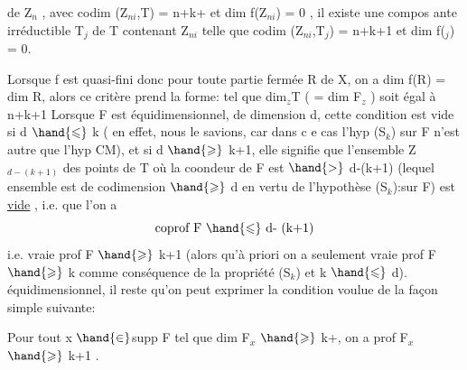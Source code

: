 
de Z$_n$ , avec codim (Z$_{ni}$,T) = n+k+ et dim f(Z$_{ni}$) = 0 , il existe
une compos ante irréductible T$_j$ de T contenant Z$_{ni}$ telle que
codim (Z$_{ni}$,T$_j$) = n+k+1 et dim f($_j$) = 0.

Lorsque f est quasi-fini donc pour toute partie fermée R de X,
on a dim f(R) = dim R, alors ce critère prend la forme:  
  tel que dim$_z$T ( = dim F$_z$ ) soit égal à
n+k+1  Lorsque F est équidimensionnel, 
de dimension d,  cette condition
est vide si d $\hand{\leqslant}$ k ( en effet, nous le savions, car dans c e cas l'hyp
(S$_k$) sur F n'est autre que l'hyp CM), et si d $\hand{\geqslant}$ k+1, elle signifie
que l'ensemble Z$_{d - (k+1)}$ des points de T où la coondeur de F est
$\hand{>}$ d-(k+1) (lequel ensemble est de codimension $\hand{\geqslant}$ d  en vertu de
l'hypothèse (S$_k$):sur F) est \uline{vide} , i.e. que 
l'on a 
\[ \text{coprof F } \hand{\leqslant} \text{ d- (k+1)} \]
i.e. vraie prof F $\hand{\geqslant}$ k+1
(alors qu'à priori on a seulement vraie prof F $\hand{\geqslant}$ k comme conséquence
de la propriété (S$_k$) et k $\hand{\leqslant}$ d).  
 équidimensionnel, il reste qu'on
peut exprimer la condition voulue de la façon simple suivante:

 Pour tout  x $\hand{\in}$supp F tel que dim F$_x$ $\hand{\geqslant}$ k+, on a prof F$_x$ $\hand{\geqslant}$ k+1 .


